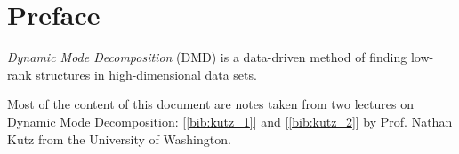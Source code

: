 \documentclass[10pt,twocolumn]{article}
\begin{document}

\setlength{\parindent}{0cm}

\vspace{10mm}

\setlength{\parindent}{0cm}

\fontsize{14}{10}\selectfont {Kamila Zdybał}

\vspace{2mm}

\fontsize{10}{10}

\vspace{2mm}

\fontsize{10}{10}

\section*{Preface}

\textit{Dynamic Mode Decomposition} (DMD) is a data-driven method of finding low-rank structures in high-dimensional data sets. 

Most of the content of this document are notes taken from two lectures on Dynamic Mode Decomposition: [\ref{bib:kutz_1}] and [\ref{bib:kutz_2}] by Prof. Nathan Kutz from the University of Washington. 

\,\,
\end{document}

